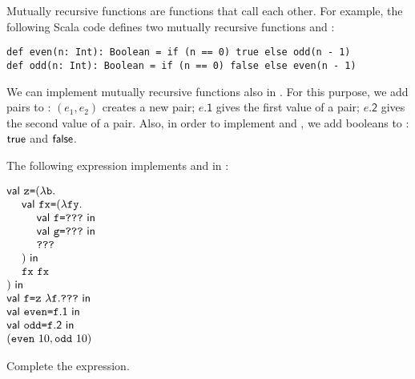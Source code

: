 \begin{exercise}

Mutually recursive functions are functions that call each
other. For example, the following Scala code defines two mutually
recursive functions  and :

\begin{verbatim}
def even(n: Int): Boolean = if (n == 0) true else odd(n - 1)
def odd(n: Int): Boolean = if (n == 0) false else even(n - 1)
\end{verbatim}

We can implement mutually recursive functions also in \plang. For this purpose,
we add pairs to \plang: $(e_1, e_2)$ creates a new pair; $e\textsf{.1}$ gives
the first value of a pair; $e\textsf{.2}$ gives the second value of a pair.
Also, in order to implement  and , we add booleans to
: $\textsf{true}$ and $\textsf{false}$.

The following expression implements  and  in \plang:

$\begin{array}{@{}l@{}}
  \ebind{\cz}{(\efun{\cb}{\\
  \ \ \ \ \ebind{\code{fx}}{(\efun{\code{fy}}{\\
  \ \ \ \ \ \ \ \ \ebind{\cf}{\code{???}}{\\
  \ \ \ \ \ \ \ \ \ebind{\code{g}}{\code{???}}{\\
  \ \ \ \ \ \ \ \ \code{???}}}}\\\ \ \ \ )}{\\
  \ \ \ \ \eapp{\code{fx}}{\code{fx}}}}\\)}{\\
  \ebind{\cf}{\eapp{\cz}{\efun{\cf}{\code{???}}}}{\\
  \ebind{\code{even}}{\cf\textsf{.1}}{\\
  \ebind{\code{odd}}{\cf\textsf{.2}}{\\
  (\eapp{\code{even}}{10}, \eapp{\code{odd}}{10})}}}}
\end{array}$

Complete the expression.

\end{exercise}
